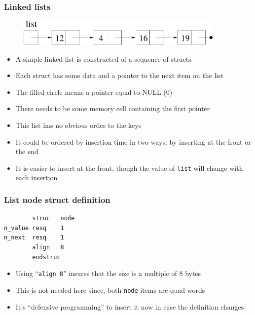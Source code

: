 \documentclass{beamer}
\begin{document}
\begin{frame}[fragile]
    \frametitle{Linked lists}
    \begin{figure}[h!]
    \centering\includegraphics[width=4.0in]{linked_list_named.pdf}
    \end{figure}

    \begin{itemize}
        \item A simple linked list is constructed of a sequence of structs
        \item Each struct has some data and a pointer to the next item on the list
        \item The filled circle means a pointer equal to NULL (0)
        \item There needs to be some memory cell containing the first pointer
        \item This list has no obvious order to the keys
        \item It could be ordered by insertion time in two ways: by inserting
              at the front or the end
        \item It is easier to insert at the front, though the value of {\tt list}
              will change with each insertion
    \end{itemize}

\end{frame}

\begin{frame}[fragile]
    \frametitle{List node struct definition}
\begin{verbatim}
        struc   node
n_value resq    1
n_next  resq    1
        align   8
        endstruc
\end{verbatim}
    \begin{itemize}
        \item Using ``{\tt align 8}'' insures that the size is a multiple
              of 8 bytes
        \item This is not needed here since, both {\tt node} items are quad words
        \item It's ``defensive programming'' to insert it now in case the 
              definition changes
    \end{itemize}
\end{frame}
\end{document}
